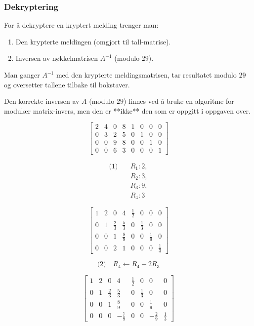 \documentclass[12pt,a4paper]{article}
\begin{document}
\subsubsection*{Dekryptering}
For å dekryptere en kryptert melding trenger man:
\begin{enumerate}
\item Den krypterte meldingen (omgjort til tall‑matrise).
\item Inversen av nøkkelmatrisen $A^{-1}$ (modulo $29$).
\end{enumerate}
Man ganger $A^{-1}$ med den krypterte meldingsmatrisen, tar resultatet
modulo $29$ og oversetter tallene tilbake til bokstaver.  

Den korrekte inversen av $A$ (modulo $29$) finnes ved å bruke en algoritme for
modulær matrix‑invers, men den er **ikke** den som er oppgitt i oppgaven
over.


\[
\left[
\begin{array}{cccc|cccc}
2 & 4 & 0 & 8 & 1 & 0 & 0 & 0 \\
0 & 3 & 2 & 5 & 0 & 1 & 0 & 0 \\
0 & 0 & 9 & 8 & 0 & 0 & 1 & 0 \\
0 & 0 & 6 & 3 & 0 & 0 & 0 & 1
\end{array}
\right]
\]



\[ \begin{aligned} \text{(1)}\quad & R_1 : 2, \\ & R_2 : 3, \\ & R_3 : 9, \\ & R_4 : 3 \end{aligned} \]


\[
\left[
\begin{array}{cccc|cccc}
1 & 2 & 0 & 4 & \tfrac12 & 0 & 0 & 0 \\
0 & 1 & \tfrac{2}{3} & \tfrac{5}{3} & 0 & \tfrac13 & 0 & 0 \\
0 & 0 & 1 & \tfrac{8}{9} & 0 & 0 & \tfrac19 & 0 \\
0 & 0 & 2 & 1 & 0 & 0 & 0 & \tfrac13
\end{array}
\right]
\]

\[ \text{(2)}\quad R_4 \leftarrow R_4 - 2R_3 \]

\[
\left[
\begin{array}{cccc|cccc}
1 & 2 & 0 & 4 & \tfrac12 & 0 & 0 & 0 \\
0 & 1 & \tfrac{2}{3} & \tfrac{5}{3} & 0 & \tfrac13 & 0 & 0 \\
0 & 0 & 1 & \tfrac{8}{9} & 0 & 0 & \tfrac19 & 0 \\
0 & 0 & 0 & -\tfrac{7}{9} & 0 & 0 & -\tfrac{2}{9} & \tfrac13
\end{array}
\right]
\]
\end{document}

